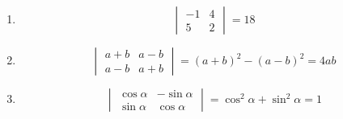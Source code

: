 \documentclass[12pt, a4paper]{article}
\begin{document}
    \begin{exmp}
        \begin{enumerate}
            \(  \)
            \item \[
                \begin{vmatrix}
                    -1 & 4 \\ 5 & 2
                \end{vmatrix} = 18
            \] 
            \item \[
                \begin{vmatrix}
                    a + b & a - b \\ a-b & a + b
                \end{vmatrix} = (a+b)^2 - (a-b)^2 = 4ab
            \]
            \item \[
                \begin{vmatrix}
                    \cos \alpha & - \sin \alpha \\ \sin \alpha & \cos \alpha
                \end{vmatrix} = \cos ^2\alpha + \sin ^2\alpha = 1
            \] 
        \end{enumerate}
    \end{exmp}
\end{document}

